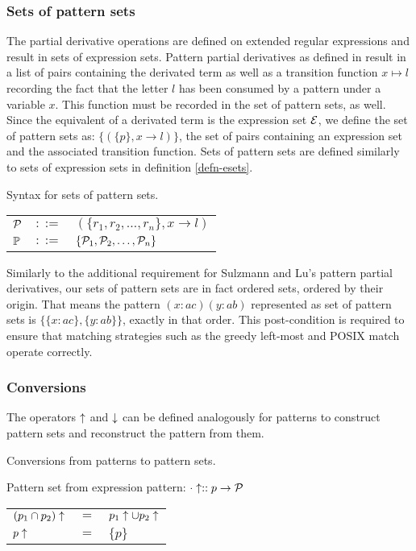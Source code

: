 \subsubsection{Sets of pattern sets}

The partial derivative operations are defined on extended regular expressions
and result in sets of expression sets. Pattern partial derivatives as defined in
\cite{pdpat} result in a list of pairs containing the derivated term as well as
a transition function $x \mapsto l$ recording the fact that the letter $l$ has
been consumed by a pattern under a variable $x$. This function must be recorded
in the set of pattern sets, as well. Since the equivalent of a derivated term is
the expression set $\mathcal{E}$, we define the set of pattern sets as: $\{ (\{ p \},
x \to l) \}$, the set of pairs containing an expression set and the associated
transition function. Sets of pattern sets are defined similarly to sets of
expression sets in definition \ref{defn-esets}.

\begin{defn}
   \label{defn-psets}
   Syntax for sets of pattern sets.

   \begin{tabular}{lll}
      $\mathcal{P}$	& $::=$ & $(\{r_1, r_2, \dots, r_n\}, x \to l)$ \\
      $\mathbb{P}$	& $::=$ & $\{\mathcal{P}_1, \mathcal{P}_2, \dots, \mathcal{P}_n\}$ \\
   \end{tabular}
\end{defn}

Similarly to the additional requirement for Sulzmann and Lu's pattern partial
derivatives, our sets of pattern sets are in fact ordered sets, ordered by their
origin. That means the pattern $(x:ac)(y:ab)$ represented as set of pattern sets
is $\{\{x:ac\}, \{y:ab\}\}$, exactly in that order. This post-condition is
required to ensure that matching strategies such as the greedy left-most and
POSIX match operate correctly.


\subsubsection{Conversions}

The operators $\uparrow$ and $\downarrow$ can be defined analogously for
patterns to construct pattern sets and reconstruct the pattern from them.

\begin{defn}
   \label{defn-re2pset}
   Conversions from patterns to pattern sets.

   Pattern set from expression pattern:
   $\cdot\uparrow :: p \to \mathcal{P}$

   \begin{tabular}{lll}
      $(p_1 \cap p_2)\uparrow$	& $=$	& $p_1\uparrow \cup p_2\uparrow$	\\
      $p\uparrow$			& $=$	& $\{p\}$			\\
   \end{tabular}
\end{defn}

